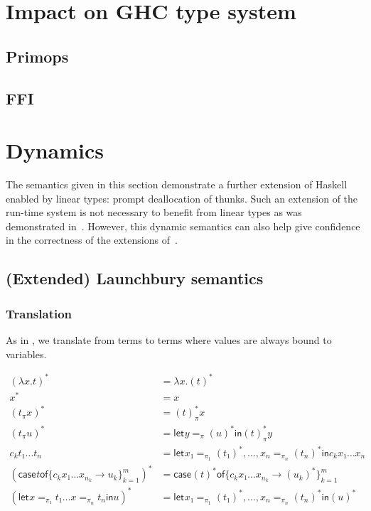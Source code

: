 \documentclass[11pt]{article}
\newcommand{\case}[3][]{\mathsf{case}_{#1} #2 \mathsf{of} \{#3\}^m_{k=1}}
\newcommand{\flet}[1][]{\mathsf{let}_{#1} }
\newcommand{\fin}{ \mathsf{in} }
\begin{document}

\section{Impact on GHC type system}
\label{sec:ghc}

\subsection{Primops}
\subsection{FFI}


\section{Dynamics}
\label{sec:orgheadline16}

The semantics given in this section demonstrate a further extension of
Haskell enabled by linear types: prompt deallocation of thunks. Such
an extension of the run-time system is not necessary to benefit from
linear types as was demonstrated in~\label{sec:ghc}. However, this
dynamic semantics can also help give confidence in the correctness of
the extensions of~\label{sec:ghc}.

\subsection{(Extended) Launchbury semantics}
\label{sec:orgheadline11}

\subsubsection{Translation}
\label{sec:orgheadline9}
As in \textcite{launchbury_natural_1993}, we translate from terms to
terms where values are always bound to variables. 


\begin{align*}
(λx. t)^* &= λx. (t)^* \\
x^*       &= x \\
  (t_π  x )^* &= (t)^*_π  x \\
  (t_π  u )^* &= \flet y =_{π} (u)^* \fin (t)^*_π  y \\
c_k  t₁ … t_n &= \flet x₁ =_{π_1} (t₁)^*,…, x_n =_{π_n} (t_n)^* \fin c_k x₁ … x_n \\
(\case t {c_k  x₁ … x_{n_k} → u_k})^* &= \case {(t)^*} {c_k  x₁ … x_{n_k} → (u_k)^*} \\
(\flet x =_{π₁} t₁  …  x =_{π_n} t_n \fin u)^* & = \flet x₁ =_{π_1} (t₁)^*,…, x_n =_{π_n} (t_n)^* \fin (u)^*
\end{align*}
\end{document}
